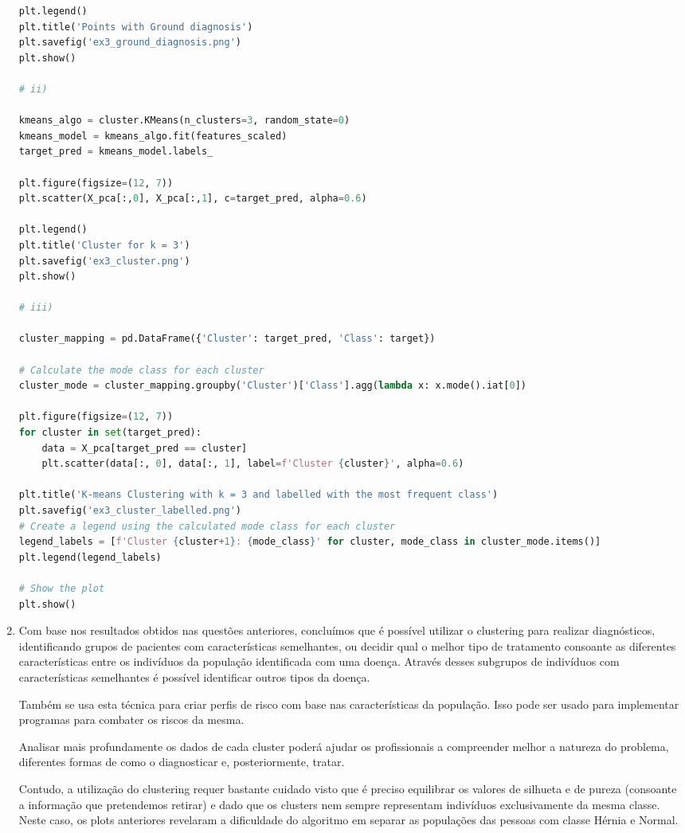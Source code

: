 \documentclass[a4paper,12pt]{article} %
\begin{document}
\begin{enumerate}
\begin{lstlisting}[language=Python]
plt.legend()
plt.title('Points with Ground diagnosis')
plt.savefig('ex3_ground_diagnosis.png')
plt.show()

# ii)

kmeans_algo = cluster.KMeans(n_clusters=3, random_state=0)
kmeans_model = kmeans_algo.fit(features_scaled)
target_pred = kmeans_model.labels_

plt.figure(figsize=(12, 7))
plt.scatter(X_pca[:,0], X_pca[:,1], c=target_pred, alpha=0.6)

plt.legend()
plt.title('Cluster for k = 3')
plt.savefig('ex3_cluster.png')
plt.show()

# iii)

cluster_mapping = pd.DataFrame({'Cluster': target_pred, 'Class': target})

# Calculate the mode class for each cluster
cluster_mode = cluster_mapping.groupby('Cluster')['Class'].agg(lambda x: x.mode().iat[0])

plt.figure(figsize=(12, 7))
for cluster in set(target_pred):
    data = X_pca[target_pred == cluster]
    plt.scatter(data[:, 0], data[:, 1], label=f'Cluster {cluster}', alpha=0.6)

plt.title('K-means Clustering with k = 3 and labelled with the most frequent class') 
plt.savefig('ex3_cluster_labelled.png')
# Create a legend using the calculated mode class for each cluster
legend_labels = [f'Cluster {cluster+1}: {mode_class}' for cluster, mode_class in cluster_mode.items()]
plt.legend(legend_labels)

# Show the plot
plt.show()
\end{lstlisting}

\item 

Com base nos resultados obtidos nas questões anteriores, concluímos que é possível utilizar o clustering para realizar diagnósticos, identificando grupos de pacientes com características semelhantes, ou decidir qual o melhor tipo de tratamento 
consoante as diferentes características entre os indivíduos da população identificada com uma doença. Através desses subgrupos de indivíduos com características semelhantes é possível identificar outros tipos da doença.

Também se usa esta técnica para criar perfis de risco com base nas características da população. Isso pode ser usado para implementar programas para combater os riscos da mesma.

Analisar mais profundamente os dados de cada cluster poderá ajudar os profissionais a compreender melhor a natureza do problema, diferentes formas de como o diagnosticar e, posteriormente, tratar.

Contudo, a utilização do clustering requer bastante cuidado visto que é preciso equilibrar os valores de silhueta e de pureza (consoante a informação que pretendemos retirar) e dado que os clusters nem sempre representam indivíduos exclusivamente da mesma classe. Neste caso, os plots anteriores revelaram a dificuldade do algoritmo em separar as populações das pessoas com classe Hérnia e Normal.

\end{enumerate}
\end{document}
